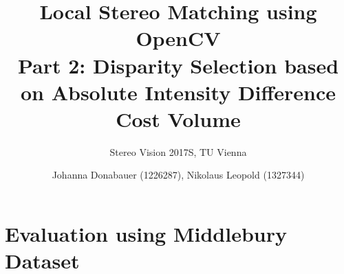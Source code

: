 \documentclass[english, paper=a4]{scrartcl}
\begin{document}
\graphicspath{{images/}}

\title{Local Stereo Matching using OpenCV\\Part 2: Disparity Selection based on Absolute Intensity Difference Cost Volume} 
\subtitle{Stereo Vision 2017S, TU Vienna} 
\author{Johanna Donabauer (1226287), Nikolaus Leopold (1327344)}
\maketitle

\section{Evaluation using Middlebury Dataset}
\end{document}
